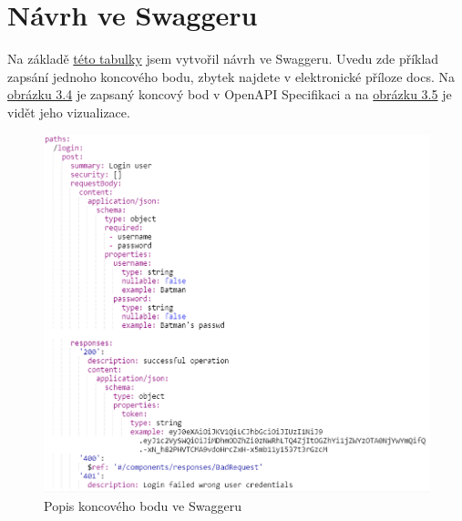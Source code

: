 \documentclass[thesis=B,czech]{FITthesis}[2012/06/26]
\begin{document}
    \section{Návrh ve Swaggeru}
        Na základě \hyperref[tab:tabulkaPokryti]{této tabulky} jsem vytvořil návrh ve Swaggeru. Uvedu zde příklad zapsání jednoho koncového bodu, zbytek najdete v elektronické příloze docs. Na \hyperref[fig:SwaggerYAML]{obrázku 3.4} je zapsaný koncový bod v OpenAPI Specifikaci a na \hyperref[fig:SwaggerGenerated]{obrázku 3.5} je vidět jeho vizualizace.
        \begin{figure}[h!] \label{SwaggerYAML}
            \includegraphics[width=\linewidth]{Swagger_YAML_example}
            \caption{Popis koncového bodu ve Swaggeru}
        \end{figure}
\end{document}
